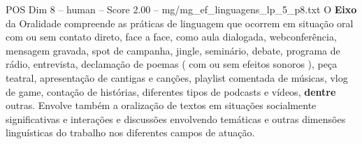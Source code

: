 \begin{textsample}{POS Dim 8 – human – Score 2.00 – mg/mg\_ef\_linguagens\_lp\_5\_p8.txt}  \label{ex:f8_pos_011}
O \textbf{Eixo} da Oralidade compreende as práticas de linguagem que ocorrem em situação oral com ou sem contato direto, face a face, como aula dialogada, webconferência, mensagem gravada, spot de campanha, jingle, seminário, debate, programa de rádio, entrevista, declamação de poemas ( com ou sem efeitos sonoros ), peça teatral, apresentação de cantigas e canções, playlist comentada de músicas, vlog de game, contação de histórias, diferentes tipos de podcasts e vídeos, \textbf{dentre} outras.
Envolve também a oralização de textos em situações socialmente significativas e interações e discussões envolvendo temáticas e outras dimensões linguísticas do trabalho nos diferentes campos de atuação.

\end{textsample}

